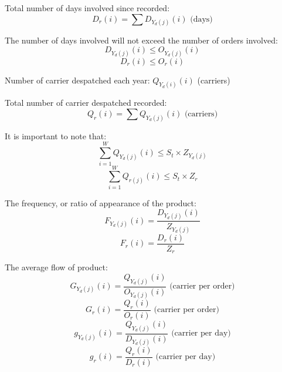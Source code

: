     Total number of days involved since recorded: \quad
    \begin{equation}\label{eq:Dr}
        D_r(i) = \sum D_{Y_d(j)}(i) \text{ (days)}
    \end{equation}

    The number of days involved will not exceed the number of orders involved:
    \begin{equation}\label{eq:leqdayorderannual}
        D_{Y_d(j)}(i) \leq O_{Y_d(j)}(i)
    \end{equation}
    \begin{equation}\label{eq:leqdayorderall}
        D_r(i) \leq O_r(i)
    \end{equation}

    Number of carrier despatched each year: \quad
    ${ Q_{Y_d(i)}(i) }$ (carriers)

    Total number of carrier despatched recorded: \quad
    \begin{equation}\label{eq:Qr}
        Q_r(i) = \sum Q_{Y_d(j)}(i) \text{ (carriers)}
    \end{equation}

    It is important to note that:
    \begin{equation}\label{eq:leqQYd}
        \sum_{i=1}^{W} Q_{Y_d(j)}(i) \leq S_t \times Z_{Y_d(j)}
    \end{equation}
    \begin{equation}\label{eq:leqQr}
        \sum_{i=1}^{W}Q_{r(j)}(i) \leq S_t \times Z_{r}
    \end{equation}

    The frequency, or ratio of appearance of the product:
    \begin{equation}\label{eq:FYd}
        F_{Y_d(j)}(i) = \frac{D_{Y_d(j)}(i)}{Z_{Y_d(j)}}
    \end{equation}
    \begin{equation}\label{eq:Fr}
        F_r(i) = \frac{D_r(i)}{Z_r}
    \end{equation}

    The average flow of product:
    \begin{equation}\label{eq:GYd}
        G_{Y_d(j)}(i) = \frac{Q_{Y_d(j)}(i)}{O_{Y_d(j)}(i)} \text{ (carrier per order)}
    \end{equation}
    \begin{equation}\label{eq:Gr}
        G_r(i) = \frac{Q_r(i)}{O_r(i)} \text{ (carrier per order)}
    \end{equation}
    \begin{equation}\label{eq:gYd}
        g_{Y_d(j)}(i) = \frac{Q_{Y_d(j)}(i)}{D_{Y_d(j)}(i)} \text{ (carrier per day)}
    \end{equation}
    \begin{equation}\label{eq:gr}
        g_r(i) = \frac{Q_r(i)}{D_r(i)} \text{ (carrier per day)}
    \end{equation}
    
